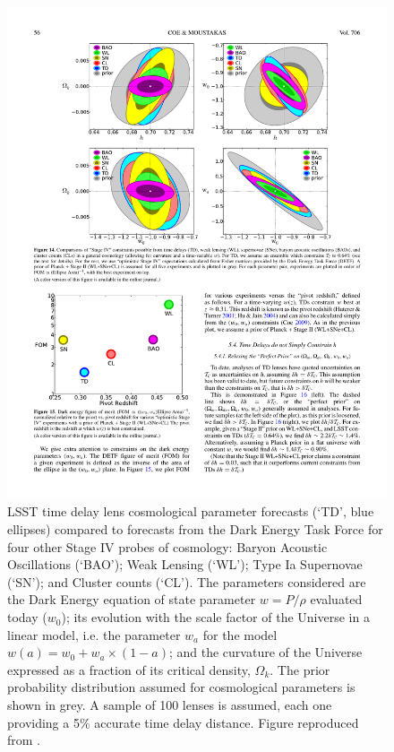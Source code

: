 \begin{figure}[!t]
    \centering\includegraphics[width=0.9\linewidth]{figs/Coe+Moustakas2009_Figure14.pdf}
    \caption{LSST time delay lens cosmological parameter forecasts (`TD', blue ellipses)
    compared to forecasts from the Dark
    Energy Task Force \citep{DETF} for four other Stage IV probes of cosmology: Baryon Acoustic Oscillations (`BAO'); Weak Lensing (`WL'); Type Ia Supernovae (`SN'); and Cluster counts (`CL').  The parameters considered are the Dark Energy equation of state parameter $w=P/\rho$ evaluated today ($w_0$); its evolution with the scale factor of the Universe in a linear model, i.e. the parameter $w_a$ for the model $w(a) = w_0 + w_a\times(1-a)$; and the curvature of the Universe expressed as a fraction of its critical density, $\Omega_k$.   The prior probability distribution assumed for cosmological parameters is shown in grey.  
    A sample of 100 lenses is assumed, each one
    providing a 5\% accurate time delay distance. Figure reproduced from
    \citet{Coe+Moustakas2009}.}
    \label{fig:sl_forecast}
\end{figure}


